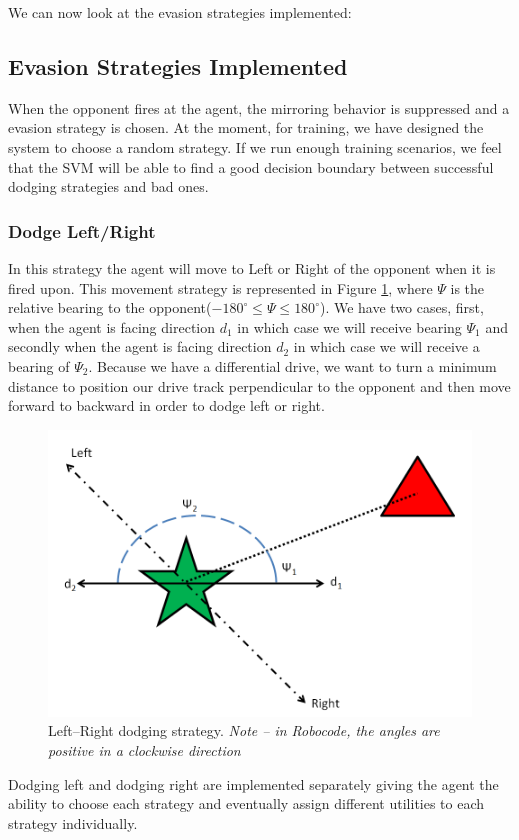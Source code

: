 \documentclass{article}
\theoremstyle{plain}
\theoremstyle{definition}
\theoremstyle{remark}
\begin{document}
We can now look at the evasion strategies implemented:

\subsection*{Evasion Strategies Implemented}
When the opponent fires at the agent, the mirroring behavior is suppressed and a evasion strategy is chosen. At the moment, for training, we have designed the system to choose a random strategy. If we run enough training scenarios, we feel that the SVM will be able to find a good decision boundary between successful dodging strategies and bad ones.

\subsubsection*{Dodge Left/Right}
In this strategy the agent will move to Left or Right of the opponent when it is fired upon. This movement strategy is represented in Figure \ref{LR}, where $\Psi$ is the relative bearing to the opponent($-180^{\circ} \leq \Psi \leq 180^{\circ}$). We have two cases, first, when the agent is facing direction $d_1$ in which case we will receive bearing $\Psi_1$ and secondly when the agent is facing direction $d_2$ in which case we will receive a bearing of $\Psi_2$. Because we have a differential drive, we want to turn a minimum distance to position our drive track perpendicular to the opponent and then move forward to backward in order to dodge left or right.\\

\begin{figure}[h]
	\centering
		\includegraphics[width=7 cm]{LR}
	\caption{Left--Right dodging strategy. \emph{Note -- in Robocode, the angles are positive in a clockwise direction}}
	\label{LR}
\end{figure}

Dodging left and dodging right are implemented separately giving the agent the ability to choose each strategy and eventually assign different utilities to each strategy individually.
\end{document}
